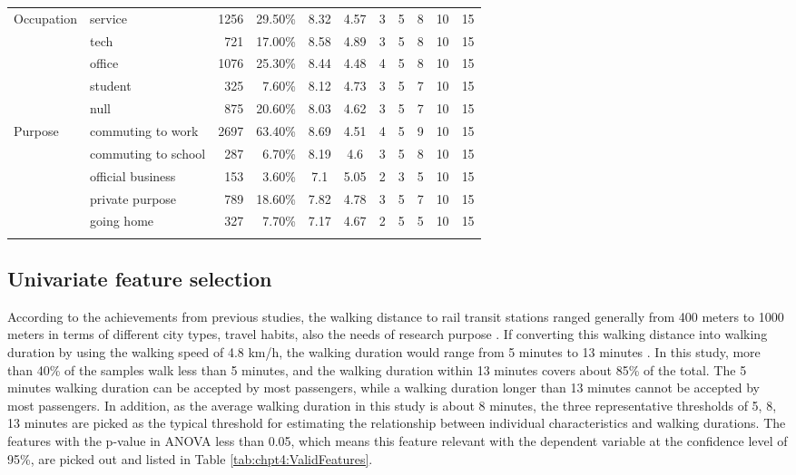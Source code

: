 \begin{sidewaystable}[htbp]
\begin{tabular}{llrrccccccc}
		\midrule
		\multicolumn{1}{l}{Occupation}
		& service  & 1256  & 29.50\%   & 8.32  & 4.57  & 3     & 5     & 8     & 10    & 15 \\
		& tech     & 721   & 17.00\%   & 8.58  & 4.89  & 3     & 5     & 8     & 10    & 15 \\
		& office   & 1076  & 25.30\%   & 8.44  & 4.48  & 4     & 5     & 8     & 10    & 15 \\
		& student  & 325   &  7.60\%   & 8.12  & 4.73  & 3     & 5     & 7     & 10    & 15 \\
		& null     & 875   & 20.60\%   & 8.03  & 4.62  & 3     & 5     & 7     & 10    & 15 \\
		
		\midrule
		\multicolumn{1}{l}{Purpose}
		& commuting to work   & 2697  & 63.40\% & 8.69  & 4.51  & 4     & 5     & 9     & 10    & 15 \\
		& commuting to school & 287   &  6.70\% & 8.19  & 4.6   & 3     & 5     & 8     & 10    & 15 \\
		& official business   & 153   &  3.60\% & 7.1   & 5.05  & 2     & 3     & 5     & 10    & 15 \\
		& private purpose     & 789   & 18.60\% & 7.82  & 4.78  & 3     & 5     & 7     & 10    & 15 \\
		& going home          & 327   &  7.70\% & 7.17  & 4.67  & 2     & 5     & 5     & 10    & 15 \\
		\Xhline{1.5pt}
	\end{tabular}
	\normalsize
\end{sidewaystable}

%
\subsection{Univariate feature selection}
According to the achievements from previous studies, the walking distance to rail transit stations ranged generally from 400 meters to 1000 meters in terms of different city types, travel habits, also the needs of research purpose \cite{guerra2012half,murray1998public,o1996walking,keijer2000people,zhao2003forecasting,alshalalfah2007case}. If converting this walking distance into walking duration by using the walking speed of 4.8 km/h, the walking duration would range from 5 minutes to 13 minutes \cite{bohannon1997comfortable}. In this study, more than 40\% of the samples walk less than 5 minutes, and the walking duration within 13 minutes covers about 85\% of the total. The 5 minutes walking duration can be accepted by most passengers, while a walking duration longer than 13 minutes cannot be accepted by most passengers. In addition, as the average walking duration in this study is about 8 minutes, the three representative thresholds of 5, 8, 13 minutes are picked as the typical threshold for estimating the relationship between individual characteristics and walking durations. The features with the p-value in ANOVA less than 0.05, which means this feature relevant with the dependent variable at the confidence level of 95\%, are picked out and listed in Table \ref{tab:chpt4:ValidFeatures}.


